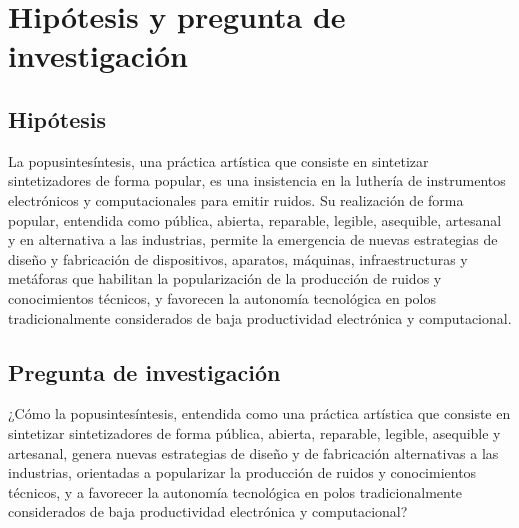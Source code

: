 \documentclass[../candidatura.tex]{subfiles}
\begin{document}
\section{Hipótesis y pregunta de investigación}

\subsection{Hipótesis}

La popusintesíntesis, una práctica artística que consiste en sintetizar sintetizadores de forma popular, es una insistencia en la luthería de instrumentos electrónicos y computacionales para emitir ruidos. Su realización de forma popular, entendida como pública, abierta, reparable, legible, asequible, artesanal y en alternativa a las industrias, permite la emergencia de nuevas estrategias de diseño y fabricación de dispositivos, aparatos, máquinas, infraestructuras y metáforas que habilitan la popularización de la producción de ruidos y conocimientos técnicos, y favorecen la autonomía tecnológica en polos tradicionalmente considerados de baja productividad electrónica y computacional.

\subsection{Pregunta de investigación}

¿Cómo la popusintesíntesis, entendida como una práctica artística que consiste en sintetizar sintetizadores de forma pública, abierta, reparable, legible, asequible y artesanal, genera nuevas estrategias de diseño y de fabricación alternativas a las industrias, orientadas a popularizar la producción de ruidos y conocimientos técnicos, y a favorecer la autonomía tecnológica en polos tradicionalmente considerados de baja productividad electrónica y computacional?

\end{document}
